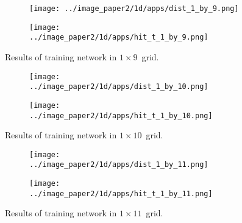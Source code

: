 {    \begin{figure}
        \begin{subfigure}[b]{0.5\textwidth}
            \centering
            \texttt{[image: ../image\_paper2/1d/apps/dist\_1\_by\_9.png]}
        \end{subfigure}
        \hfill
        \begin{subfigure}[b]{0.5\textwidth}
             \texttt{[image: ../image\_paper2/1d/apps/hit\_t\_1\_by\_9.png]}
        \end{subfigure}
                \caption{Results of training network in $1\times9$~grid.}
         \label{fig: 1by9T}
    \end{figure}

    \begin{figure}
        \begin{subfigure}[b]{0.5\textwidth}
            \centering
            \texttt{[image: ../image\_paper2/1d/apps/dist\_1\_by\_10.png]}
        \end{subfigure}
        \hfill
        \begin{subfigure}[b]{0.5\textwidth}
             \texttt{[image: ../image\_paper2/1d/apps/hit\_t\_1\_by\_10.png]}
        \end{subfigure}
                \caption{Results of training network in $1\times10$~grid.}
         \label{fig: 1by10T}
    \end{figure}

    \begin{figure}
        \begin{subfigure}[b]{0.5\textwidth}
            \centering
            \texttt{[image: ../image\_paper2/1d/apps/dist\_1\_by\_11.png]}
        \end{subfigure}
        \hfill
        \begin{subfigure}[b]{0.5\textwidth}
             \texttt{[image: ../image\_paper2/1d/apps/hit\_t\_1\_by\_11.png]}
        \end{subfigure}
                \caption{Results of training network in $1\times11$~grid.}
         \label{fig: 1by11T}
    \end{figure}
    

}
